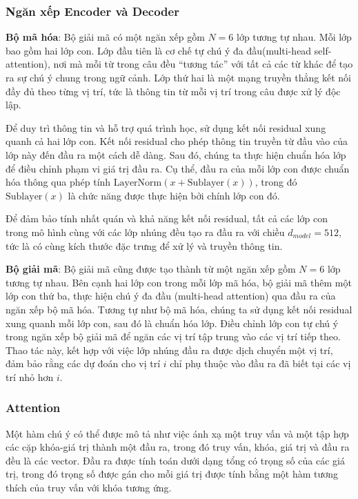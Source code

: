 \subsubsection*{Ngăn xếp Encoder và Decoder}
\textbf{Bộ mã hóa}: Bộ giải mã có một ngăn xếp gồm $N = 6$ lớp tương tự nhau. Mỗi lớp bao gồm hai lớp con. Lớp đầu tiên là cơ chế  tự chú ý đa đầu(multi-head self-attention), nơi mà mỗi từ trong câu đều ``tương tác'' với tất cả các từ khác để tạo ra sự chú ý chung trong ngữ cảnh. Lớp thứ hai là một mạng truyền thẳng kết nối đầy đủ theo từng vị trí, tức là thông tin từ mỗi vị trí trong câu được xử lý độc lập.

Để duy trì thông tin và hỗ trợ quá trình học, sử dụng kết nối residual xung quanh cả hai lớp con. Kết nối residual cho phép thông tin truyền từ đầu vào của lớp này đến đầu ra một cách dễ dàng. Sau đó, chúng ta thực hiện chuẩn hóa lớp để điều chỉnh phạm vi giá trị đầu ra. Cụ thể, đầu ra của mỗi lớp con được chuẩn hóa thông qua phép tính $\text{LayerNorm}(x + \text{Sublayer}(x))$, trong đó $\text{Sublayer}(x)$ là chức năng được thực hiện bởi chính lớp con đó.

Để đảm bảo tính nhất quán và khả năng kết nối residual, tất cả các lớp con trong mô hình cùng với các lớp nhúng đều tạo ra đầu ra với chiều $d_{model} = 512$, tức là có cùng kích thước đặc trưng để xử lý và truyền thông tin.

\textbf{Bộ giải mã}: Bộ giải mã cũng được tạo thành từ một ngăn xếp gồm $N = 6$ lớp tương tự nhau. Bên cạnh hai lớp con trong mỗi lớp mã hóa, bộ giải mã thêm một lớp con thứ ba, thực hiện chú ý đa đầu (multi-head attention) qua đầu ra của ngăn xếp bộ mã hóa. Tương tự như bộ mã hóa, chúng ta sử dụng kết nối residual xung quanh mỗi lớp con, sau đó là chuẩn hóa lớp. Điều chỉnh lớp con tự chú ý trong ngăn xếp bộ giải mã để ngăn các vị trí tập trung vào các vị trí tiếp theo. Thao tác này, kết hợp với việc lớp nhúng đầu ra được dịch chuyển một vị trí, đảm bảo rằng các dự đoán cho vị trí $i$ chỉ phụ thuộc vào đầu ra đã biết tại các vị trí nhỏ hơn $i$.

\subsubsection*{Attention}
Một hàm chú ý có thể được mô tả như việc ánh xạ một truy vấn và một tập hợp các cặp khóa-giá trị thành một đầu ra, trong đó truy vấn, khóa, giá trị và đầu ra đều là các vector. Đầu ra được tính toán dưới dạng tổng có trọng số của các giá trị, trong đó trọng số được gán cho mỗi giá trị được tính bằng một hàm tương thích của truy vấn với khóa tương ứng.

